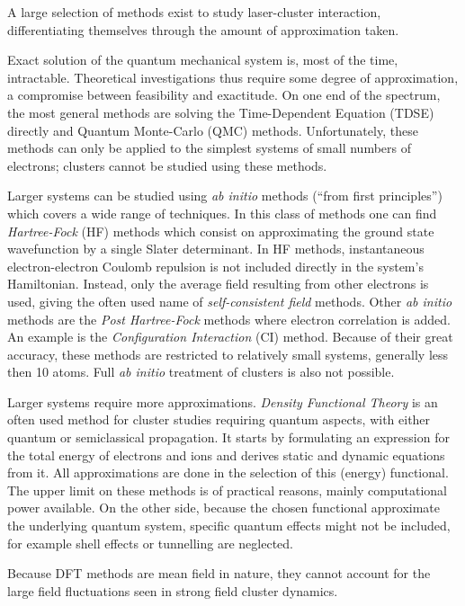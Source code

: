 A large selection of methods exist to study laser-cluster interaction,
differentiating themselves through the amount of approximation taken.

Exact solution of the quantum mechanical system is, most of the time,
intractable. Theoretical investigations thus require some degree of
approximation, a compromise between feasibility and exactitude. On one end of
the spectrum, the most general methods are solving the
Time-Dependent \schrodinger Equation (TDSE) directly and Quantum Monte-Carlo
(QMC) methods\cite{Nightingale1998}. Unfortunately, these methods can only be applied to the simplest
systems of small numbers of electrons; clusters cannot be studied using these
methods.

Larger systems can be studied using \textit{ab initio} methods (``from
first principles'') which covers a wide range of techniques. In this class of
methods one can find \textit{Hartree-Fock} (HF) methods which consist on
approximating the ground state wavefunction by a single Slater
determinant\cite{Laaksonen1986,Schafer2009}.
In HF methods, instantaneous electron-electron Coulomb repulsion is not
included directly in the system's Hamiltonian. Instead, only the average field
resulting from other electrons is used, giving the often used name of
\textit{self-consistent field} methods. Other \textit{ab
initio} methods are the \textit{Post Hartree-Fock} methods where electron
correlation is added\cite{Cramer2004}. An example is the \textit{Configuration Interaction} (CI)
method. Because of their great accuracy, these methods are restricted to
relatively small systems, generally less then 10 atoms. Full \textit{ab initio}
treatment of clusters is also not possible.

Larger systems require
more approximations. \textit{Density Functional Theory}
is an often used method for cluster studies requiring quantum aspects, with
either quantum or semiclassical propagation\cite{Schafer2009,Fennel2010}.
It starts by formulating an
expression for the total energy of electrons and ions and derives static and
dynamic equations from it. All approximations are done in the selection of this
(energy) functional. The upper limit on these methods is of practical reasons,
mainly computational power available. On the other side, because the chosen
functional approximate the underlying quantum system, specific quantum effects
might not be included, for example shell effects or tunnelling are neglected.

Because DFT methods are mean field in nature, they cannot account for the large
field fluctuations seen in strong field cluster dynamics.

